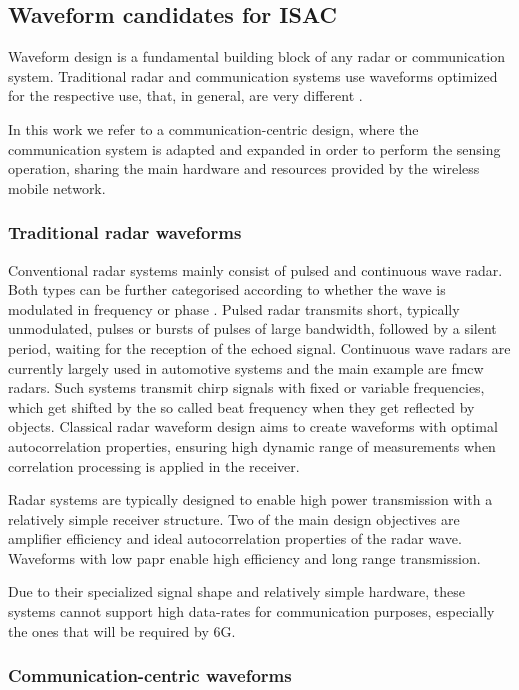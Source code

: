 	\subsection{Waveform candidates for ISAC}
	
	Waveform design is a fundamental building block of any radar or communication system. Traditional radar and communication systems use waveforms optimized for the respective use, that, in general, are very different \cite{Zhang_Rahman_Wu_Huang_Guo_Chen_Yuan_2022}.
	
	In this work we refer to a communication-centric design, where the communication system is adapted and expanded in order to perform the sensing operation, sharing the main hardware and resources provided by the wireless mobile network.
	 
	
	\subsubsection{Traditional radar waveforms}
	
	Conventional radar systems mainly consist of pulsed and continuous wave radar. Both types can be further categorised according to whether the wave is modulated in frequency or phase \cite{Friedlander_2007}.
	Pulsed radar transmits short, typically unmodulated, pulses or bursts of pulses of large bandwidth, followed by a silent period, waiting for the reception of the echoed signal. Continuous wave radars are currently largely used in automotive systems and the main example are \gls{fmcw} radars. Such systems transmit chirp signals with fixed or variable frequencies, which get shifted by the so called beat frequency when they get reflected by objects.
	Classical radar waveform design aims to create waveforms with optimal autocorrelation properties, ensuring high dynamic range of measurements when correlation processing is applied in the receiver.
	
	Radar systems are typically designed to enable high power transmission with a relatively simple receiver structure. Two of the main design objectives are amplifier efficiency and ideal autocorrelation properties of the radar wave. Waveforms with low \gls{papr} enable high efficiency and long range transmission.
	
	Due to their specialized signal shape and relatively simple hardware, these systems cannot support high data-rates for communication purposes, especially the ones that will be required by 6G.
	
	\subsubsection{Communication-centric waveforms}
	
